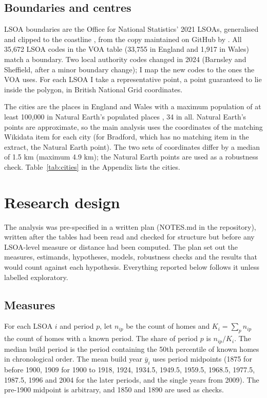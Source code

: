 \documentclass[11pt,a4paper]{article}
\begin{document}
\subsection{Boundaries and centres}
LSOA boundaries are the Office for National Statistics' 2021 LSOAs, generalised and clipped to the coastline \citep{ons2021lsoa}, from the copy maintained on GitHub by \citet{kane2026}. All 35,672 LSOA codes in the VOA table (33,755 in England and 1,917 in Wales) match a boundary. Two local authority codes changed in 2024 (Barnsley and Sheffield, after a minor boundary change); I map the new codes to the ones the VOA uses. For each LSOA I take a representative point, a point guaranteed to lie inside the polygon, in British National Grid coordinates.

The cities are the places in England and Wales with a maximum population of at least 100,000 in Natural Earth's populated places \citep{naturalearth}, 34 in all. Natural Earth's points are approximate, so the main analysis uses the coordinates of the matching Wikidata item for each city \citep{wikidata} (for Bradford, which has no matching item in the extract, the Natural Earth point). The two sets of coordinates differ by a median of 1.5 km (maximum 4.9 km); the Natural Earth points are used as a robustness check. Table~\ref{tab:cities} in the Appendix lists the cities.

\section{Research design}
\label{sec:design}
The analysis was pre-specified in a written plan (NOTES.md in the repository), written after the tables had been read and checked for structure but before any LSOA-level measure or distance had been computed. The plan set out the measures, estimands, hypotheses, models, robustness checks and the results that would count against each hypothesis. Everything reported below follows it unless labelled exploratory.

\subsection{Measures}
For each LSOA $i$ and period $p$, let $n_{ip}$ be the count of homes and $K_i=\sum_p n_{ip}$ the count of homes with a known period. The share of period $p$ is $n_{ip}/K_i$. The median build period is the period containing the 50th percentile of known homes in chronological order. The mean build year $\bar{y}_i$ uses period midpoints (1875 for before 1900, 1909 for 1900 to 1918, 1924, 1934.5, 1949.5, 1959.5, 1968.5, 1977.5, 1987.5, 1996 and 2004 for the later periods, and the single years from 2009). The pre-1900 midpoint is arbitrary, and 1850 and 1890 are used as checks.
\end{document}
